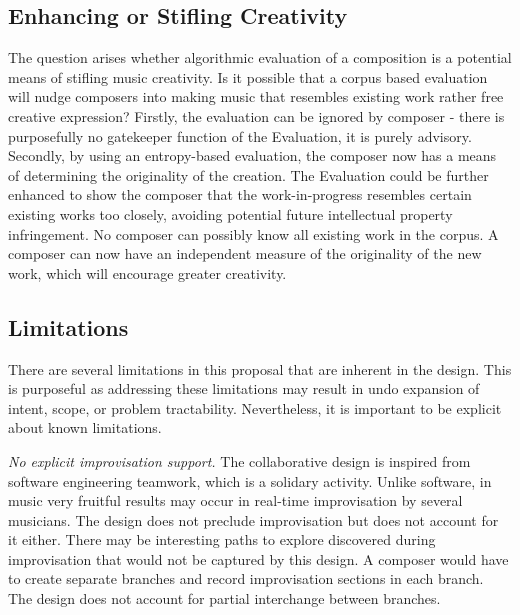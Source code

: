 \documentclass[final,authoryear,5p,times,twocolumn]{elsarticle}
\begin{document}



\subsection{Enhancing or Stifling Creativity}

The question arises whether algorithmic evaluation of a composition is a potential means of stifling music creativity. Is it possible that a corpus based evaluation will nudge composers into making music that resembles existing work rather free creative expression? Firstly, the evaluation can be ignored by composer - there is purposefully no gatekeeper function of the Evaluation, it is purely advisory. Secondly, by using an entropy-based evaluation, the composer now has a means of determining the originality of the creation. The Evaluation could be further enhanced to show the composer that the work-in-progress resembles certain existing works too closely, avoiding potential future intellectual property infringement. No composer can possibly know all existing work in the corpus. A composer can now have an independent measure of the originality of the new work, which will encourage greater creativity.

\subsection{Limitations}

There are several limitations in this proposal that are inherent in the design. This is purposeful as addressing these limitations may result in undo expansion of intent, scope, or problem tractability. Nevertheless, it is important to be explicit about known limitations.

\textit{No explicit improvisation support.} The collaborative design is inspired from software engineering teamwork, which is a solidary activity. Unlike software, in music very fruitful results may occur in real-time improvisation by several musicians. The design does not preclude improvisation but does not account for it either. There may be interesting paths to explore discovered during improvisation that would not be captured by this design. A composer would have to create separate branches and record improvisation sections in each branch. The design does not account for partial interchange between branches.
\end{document}

